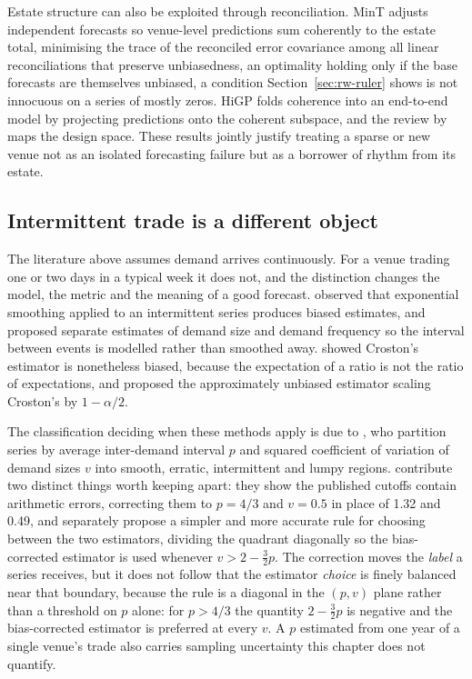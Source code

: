 Estate structure can also be exploited through reconciliation. MinT
\citep{wickramasuriya_optimal_2019} adjusts independent forecasts so venue-level
predictions sum coherently to the estate total, minimising the trace of the
reconciled error covariance among all linear reconciliations that preserve
unbiasedness, an optimality holding only if the base forecasts are themselves
unbiased, a condition Section~\ref{sec:rw-ruler} shows is not innocuous on a
series of mostly zeros. HiGP \citep{cini_graph-based_2024} folds coherence into
an end-to-end model by projecting predictions onto the coherent subspace, and the
review by \citet{athanasopoulos_forecast_2024} maps the design space. These
results jointly justify treating a sparse or new venue not as an isolated
forecasting failure but as a borrower of rhythm from its estate.

\subsection{Intermittent trade is a different object}

The literature above assumes demand arrives continuously. For a venue trading one
or two days in a typical week it does not, and the distinction changes the model,
the metric and the meaning of a good forecast.
\citet{croston_forecasting_1972} observed that exponential smoothing applied to
an intermittent series produces biased estimates, and proposed separate estimates
of demand size and demand frequency so the interval between events is modelled
rather than smoothed away. \citet{syntetos_accuracy_2005} showed Croston's
estimator is nonetheless biased, because the expectation of a ratio is not the
ratio of expectations, and proposed the approximately unbiased estimator scaling
Croston's by $1 - \alpha/2$.

The classification deciding when these methods apply is due to
\citet{syntetos_categorization_2005}, who partition series by average
inter-demand interval $p$ and squared coefficient of variation of demand sizes
$v$ into smooth, erratic, intermittent and lumpy regions.
\citet{kostenko_note_2006} contribute two distinct things worth keeping apart:
they show the published cutoffs contain arithmetic errors, correcting them to
$p = 4/3$ and $v = 0.5$ in place of 1.32 and 0.49, and separately propose a
simpler and more accurate rule for choosing between the two estimators, dividing
the quadrant diagonally so the bias-corrected estimator is used whenever
$v > 2 - \tfrac{3}{2}p$. The correction moves the \emph{label} a series receives,
but it does not follow that the estimator \emph{choice} is finely balanced near
that boundary, because the rule is a diagonal in the $(p, v)$ plane rather than a
threshold on $p$ alone: for $p > 4/3$ the quantity $2 - \tfrac{3}{2}p$ is
negative and the bias-corrected estimator is preferred at every $v$. A $p$
estimated from one year of a single venue's trade also carries sampling
uncertainty this chapter does not quantify.

